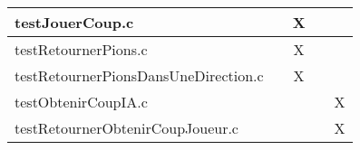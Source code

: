 \begin{table}[h]
\begin{tabular}{l|c|c|c|c|}
\multicolumn{1}{|l|}{testJouerCoup.c}                          &                       & X              &                       &                        \\ \hline
\multicolumn{1}{|l|}{testRetournerPions.c}                     &                       & X              &                       &                        \\ \hline
\multicolumn{1}{|l|}{testRetournerPionsDansUneDirection.c}     &                       & X              &                       &                        \\ \hline
\multicolumn{1}{|l|}{testObtenirCoupIA.c}     &                       &               &                       & X                        \\ \hline
\multicolumn{1}{|l|}{testRetournerObtenirCoupJoueur.c}     &                       &               &                       & X                       \\ \hline
\end{tabular}
\end{table}
\newpage
